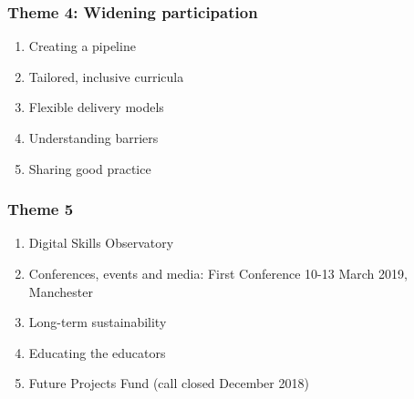 \documentclass[handout]{beamer}   %
\begin{document}
\begin{frame}[fragile]
\frametitle{Theme 4: Widening participation}
\begin{enumerate}[<+->]
\item Creating a pipeline 
\item Tailored, inclusive curricula 
\item Flexible delivery models
\item Understanding barriers 
\item Sharing good practice 
\end{enumerate}
\end{frame}
\begin{frame}[fragile]
\frametitle{Theme 5}
\begin{enumerate}[<+->]
\item Digital Skills Observatory 
\item Conferences, events and media: First Conference 10-13 March 2019, Manchester
\item Long-term sustainability 
\item Educating the educators 
\item Future Projects Fund (call closed December 2018)
\end{enumerate}
\end{frame}
\begin{frame}

\end{frame}
\end{document}
